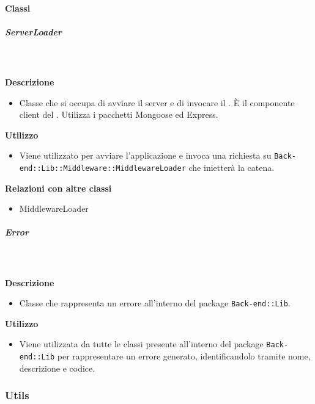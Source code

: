    \paragraph{Classi}
      \subparagraph{ServerLoader}
        
        \textbf{\\ \\ Descrizione} 
          \begin{itemize}
            \item[] Classe che si occupa di avviare il server e di invocare il . È il componente client del  . Utilizza i pacchetti Mongoose ed Express.
          \end{itemize}      
        \textbf{Utilizzo}  
          \begin{itemize}
            \item[] Viene utilizzato per avviare l'applicazione e invoca una richiesta su \texttt{Back-end::Lib::Middleware::MiddlewareLoader} che inietterà la catena.
          \end{itemize}
          \textbf{Relazioni con altre classi}
          \begin{itemize}
              \item{MiddlewareLoader}
          \end{itemize}
      \subparagraph{Error}
        
        \textbf{\\ \\ Descrizione} 
          \begin{itemize}
            \item[] Classe che rappresenta un errore all'interno del package \texttt{Back-end::Lib}.
          \end{itemize}      
        \textbf{Utilizzo}  
          \begin{itemize}
            \item[] Viene utilizzata da tutte le classi presente all'interno del package \texttt{Back-end::Lib} per rappresentare un errore generato, identificandolo tramite nome, descrizione e codice.
          \end{itemize}
  \subsubsection{Utils}
